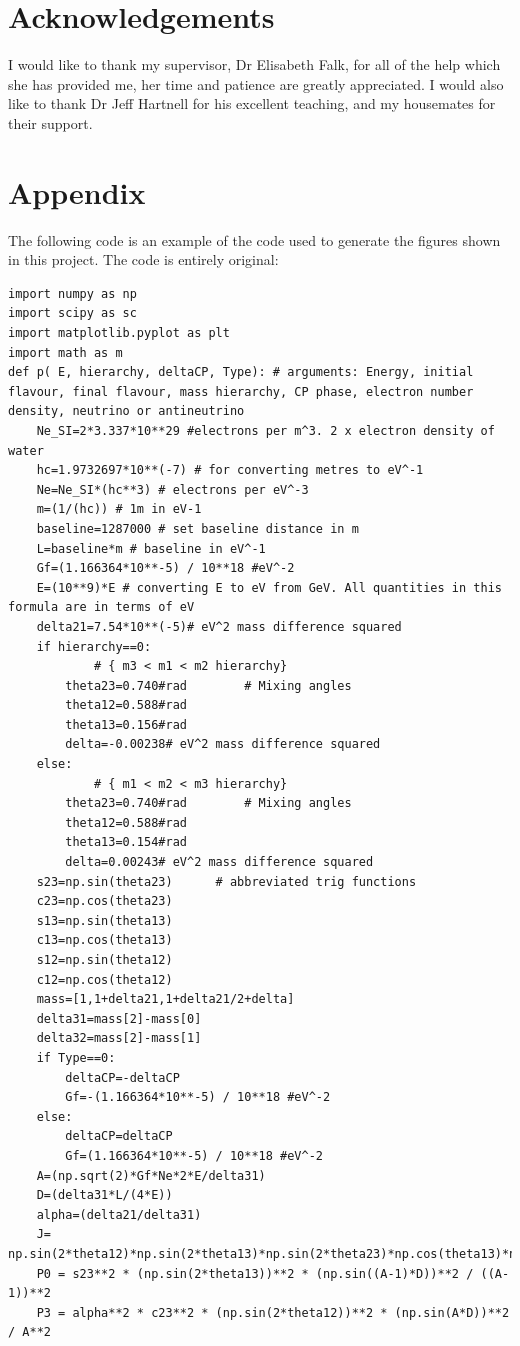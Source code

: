 \documentclass[12pt]{article}
\begin{document}
\section{Acknowledgements}
I would like to thank my supervisor, Dr Elisabeth Falk, for all of the help which she has provided me, her time and patience are greatly appreciated. I would also like to thank Dr Jeff Hartnell for his excellent teaching, and my housemates for their support.
\newpage
\section{Appendix}
The following code is an example of the code used to generate the figures shown in this project. The code is entirely original:
\lstset{language=Python}  
\begin{lstlisting}
import numpy as np
import scipy as sc
import matplotlib.pyplot as plt
import math as m
def p( E, hierarchy, deltaCP, Type): # arguments: Energy, initial flavour, final flavour, mass hierarchy, CP phase, electron number density, neutrino or antineutrino
	Ne_SI=2*3.337*10**29 #electrons per m^3. 2 x electron density of water
	hc=1.9732697*10**(-7) # for converting metres to eV^-1
	Ne=Ne_SI*(hc**3) # electrons per eV^-3
	m=(1/(hc)) # 1m in eV-1
	baseline=1287000 # set baseline distance in m
	L=baseline*m # baseline in eV^-1
	Gf=(1.166364*10**-5) / 10**18 #eV^-2
	E=(10**9)*E # converting E to eV from GeV. All quantities in this formula are in terms of eV
	delta21=7.54*10**(-5)# eV^2 mass difference squared
	if hierarchy==0:
		    # { m3 < m1 < m2 hierarchy}
		theta23=0.740#rad        # Mixing angles
		theta12=0.588#rad
		theta13=0.156#rad
		delta=-0.00238# eV^2 mass difference squared  
	else:
			# { m1 < m2 < m3 hierarchy}
		theta23=0.740#rad        # Mixing angles
		theta12=0.588#rad
		theta13=0.154#rad
		delta=0.00243# eV^2 mass difference squared
	s23=np.sin(theta23)      # abbreviated trig functions
	c23=np.cos(theta23)
	s13=np.sin(theta13)
	c13=np.cos(theta13)
	s12=np.sin(theta12)
	c12=np.cos(theta12)
	mass=[1,1+delta21,1+delta21/2+delta]
	delta31=mass[2]-mass[0]
	delta32=mass[2]-mass[1]
	if Type==0:
		deltaCP=-deltaCP
		Gf=-(1.166364*10**-5) / 10**18 #eV^-2
	else:
		deltaCP=deltaCP
		Gf=(1.166364*10**-5) / 10**18 #eV^-2
	A=(np.sqrt(2)*Gf*Ne*2*E/delta31)
	D=(delta31*L/(4*E))
	alpha=(delta21/delta31)
	J=  np.sin(2*theta12)*np.sin(2*theta13)*np.sin(2*theta23)*np.cos(theta13)*np.sin(deltaCP)
	P0 = s23**2 * (np.sin(2*theta13))**2 * (np.sin((A-1)*D))**2 / ((A-1))**2
	P3 = alpha**2 * c23**2 * (np.sin(2*theta12))**2 * (np.sin(A*D))**2 / A**2

\end{lstlisting}
\end{document}
